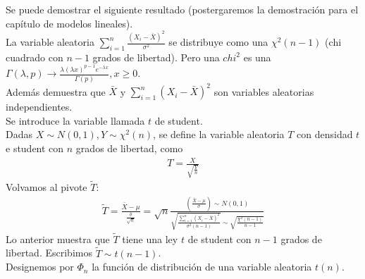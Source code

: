 \documentclass[10pt]{article}
\theoremstyle{plain}
\theoremstyle{definition}
\begin{document}
Se puede demostrar el siguiente resultado (postergaremos la demostración para el capítulo de modelos lineales).\\

La variable aleatoria $\sum_{i=1}^n {\frac{(X_{i}-\bar{X})^2}{\sigma^2}}$ se distribuye como una $\chi^2(n-1)$ (chi cuadrado con $n-1$ grados de libertad). Pero una $chi^2$ es una $\Gamma (\lambda,p) \rightarrow \frac{\lambda(\lambda x)^{p-1}e^{-\lambda x}}{\Gamma (p)}, x \ge 0$.\\
Además demuestra que $\bar{X}$ y $\sum_{i=1}^n {(X_{i}-\bar{X})^2}$ son variables aleatorias independientes.\\

Se introduce la variable llamada $t$ de student.\\
 Dadas $X \sim N(0,1), Y \sim \chi^2(n)$, se define la variable aleatoria $T$ con densidad $t$ e student con $n$ grados de libertad, como
 \begin{align*}
 T = \frac{X}{\sqrt{\frac{Y}{n}}}
 \end{align*}
 Volvamos al pivote $\tilde{T}$:
 \begin{align*}
 \tilde{T} = \frac{\bar{X}-\mu}{\frac{\hat{\sigma}}{\sqrt{n}}} = \sqrt{n}\frac{\left(\frac{\bar{X}-\mu}{\sigma}\right)\sim N(0,1)}{\sqrt{\frac{\sum_{i=1}^n {(X_{i}-\bar{X})^2}}{\sigma^2(n-1)}}\sim \sqrt{\frac{\chi^2(n-1)}{n-1}}}
 \end{align*}
 Lo anterior muestra que $\tilde{T}$ tiene una ley $t$ de student con $n-1$ grados de libertad. Escribimos $\tilde{T} \sim t(n-1)$.\\
 Designemos por $\Phi_{n}$ la función de distribución de una variable aleatoria $t(n)$.\\
 
\end{document}
